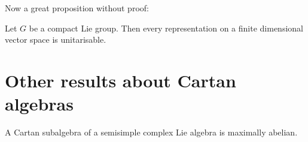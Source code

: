 Now a great proposition without proof:

\begin{proposition}
Let $G$ be a compact Lie group. Then every representation on a finite dimensional vector space is unitarisable.
\end{proposition}

\section{Other results about Cartan algebras}



\begin{lemma}
A Cartan subalgebra of a semisimple complex Lie algebra is maximally abelian. 
\end{lemma}

